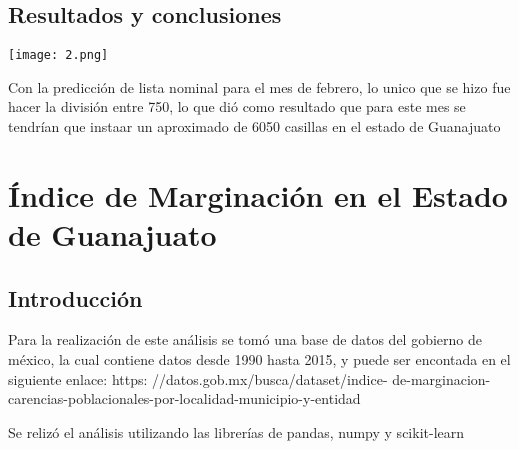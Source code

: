 \documentclass[12pt]{article}
\begin{document}
\subsection{Resultados y conclusiones}
\texttt{[image: 2.png]}

Con la predicción de lista nominal para el mes de febrero, lo unico que se hizo fue hacer la división entre 750, lo que dió como resultado que para este mes se tendrían que instaar un aproximado de 6050 casillas en el estado de Guanajuato
\section{Índice de Marginación en el Estado de Guanajuato}
\subsection{Introducción}
Para la realización de este análisis se tomó una base de datos del gobierno  de méxico, la cual contiene datos desde 1990 hasta 2015, y puede ser encontada en el siguiente enlace: https: //datos.gob.mx/busca/dataset/indice- de-marginacion-carencias-poblacionales-por-localidad-municipio-y-entidad\par

Se relizó el análisis utilizando las librerías de pandas, numpy y scikit-learn
\end{document}
